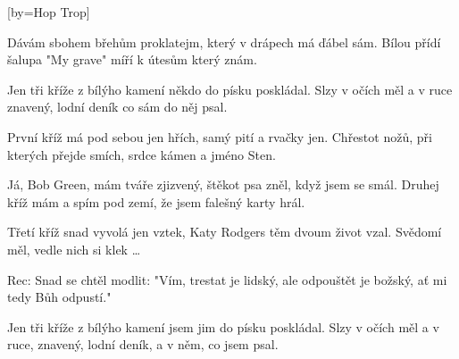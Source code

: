 [by={Hop Trop}]

\beginverse{}
Dávám sbohem břehům proklatejm,
který v drápech má ďábel sám.
Bílou přídí šalupa "My grave"
míří k útesům který znám.
\endverse{}

\beginchorus{}
Jen tři kříže z bílýho kamení někdo do písku poskládal.
Slzy v očích měl a v ruce znavený,
lodní deník co sám do něj psal.
\endchorus{}

\beginverse{}
První kříž má pod sebou jen hřích,
samý pití a rvačky jen.
Chřestot nožů, při kterých přejde smích,
srdce kámen a jméno Sten.
\endverse{}

\beginchorus{}
\phantom{}
\endchorus{}

\beginverse{}
Já, Bob Green, mám tváře zjizvený,
štěkot psa zněl, když jsem se smál.
Druhej kříž mám a spím pod zemí,
že jsem falešný karty hrál.
\endverse{}

\beginchorus{}
\phantom{}
\endchorus{}

\beginverse{}
Třetí kříž snad vyvolá jen vztek,
Katy Rodgers těm dvoum život vzal.
Svědomí měl, vedle nich si klek \ldots{}
\endverse{}

\beginverse{}
Rec: Snad se chtěl modlit: "Vím, trestat je lidský,
ale odpouštět je božský, ať mi tedy Bůh odpustí."
\endverse{}

\beginchorus{}
Jen tři kříže z bílýho kamení jsem jim do písku poskládal.
Slzy v očích měl a v ruce, znavený,
lodní deník, a v něm, co jsem psal.
\endchorus{}

\endsong{}
